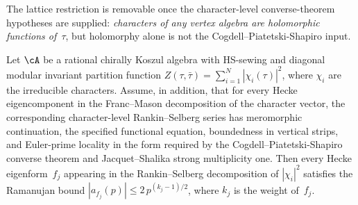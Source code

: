 The lattice restriction is removable once the character-level
converse-theorem hypotheses are supplied:
\emph{characters of any vertex algebra are holomorphic
functions of~$\tau$}, but holomorphy alone is not the
Cogdell--Piatetski-Shapiro input.

\begin{theorem}%
\label{thm:non-lattice-ramanujan}%
\ClaimStatusProvedHere%
%
Let $\cA$ be a rational chirally Koszul algebra with
HS-sewing and diagonal modular invariant partition function
$Z(\tau,\bar\tau) = \sum_{i=1}^N |\chi_i(\tau)|^2$,
where $\chi_i$ are the irreducible characters.
Assume, in addition, that for every Hecke eigencomponent in the
Franc--Mason decomposition of the character vector, the corresponding
character-level Rankin--Selberg series has meromorphic continuation,
the specified functional equation, boundedness in vertical strips, and
Euler-prime locality in the form required by the
Cogdell--Piatetski-Shapiro converse theorem and Jacquet--Shalika
strong multiplicity one.
Then every Hecke eigenform~$f_j$ appearing in
the Rankin--Selberg decomposition of $|\chi_i|^2$ satisfies
the Ramanujan bound
$|a_{f_j}(p)| \leq 2\,p^{(k_j-1)/2}$, where $k_j$ is the
weight of~$f_j$.
\end{theorem}

